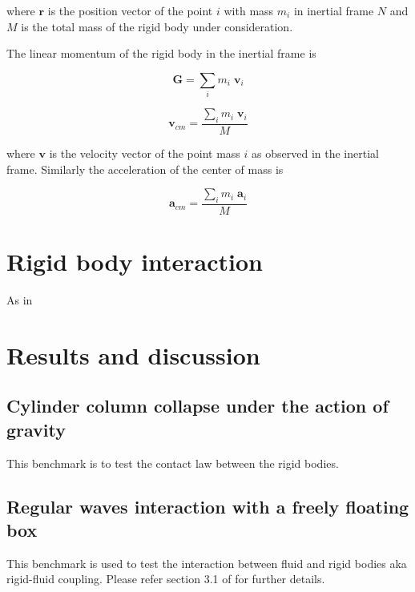 \documentclass[preprint,12pt]{elsarticle}
\newcommand{\ten}[1]{\ensuremath{\mathbf{#1}}}
\begin{document}
\noindent where $\ten{r}$ is the position vector of the point $i$ with mass
$m_i$ in inertial frame $N$ and $M$ is the total mass of the rigid body under
consideration.


The linear momentum of the rigid body in the inertial frame is


\begin{equation}
  \label{eq:lin-mom-of-rigid-body}
  \ten{G} = \sum_i m_i \; \ten{v}_i
\end{equation}


\begin{equation}
  \label{eq:center-of-mass-velocity}
  \ten{v}_{cm} = \frac{\sum_i m_i \; \ten{v}_i}{M}
\end{equation}

\noindent where $\ten{v}$ is the velocity vector of the point mass $i$ as
observed in the inertial frame. Similarly the acceleration of the center of
mass is


\begin{equation}
  \label{eq:acceleration-of-rigid-body}
  \ten{a}_{cm} = \frac{\sum_i m_i \; \ten{a}_i}{M}
\end{equation}



\section{Rigid body interaction}
\label{sec:rigid-body-inter}

As in




\section{Results and discussion}
\label{sec:results}

\subsection{Cylinder column collapse under the action of gravity}
\label{sec:cylinder-column-collapse}


This benchmark is to test the contact law between the rigid bodies.


\subsection{Regular waves interaction with a freely floating box}
\label{sec:cylinder-column-collapse}

This benchmark is used to test the interaction between fluid and rigid bodies
aka rigid-fluid coupling. Please refer section 3.1 of \cite{dominguez2019sph}
for further details.
\end{document}
